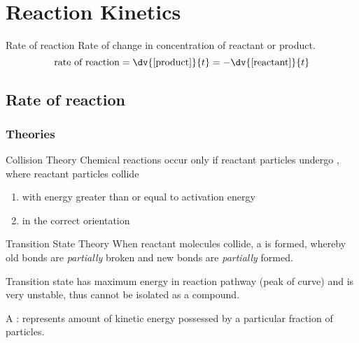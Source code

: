 \section{Reaction Kinetics}
\begin{defn}{Rate of reaction}{}
Rate of change in concentration of reactant or product.
\begin{equation}
\text{rate of reaction} = \dv{[\text{product}]}{t} = -\dv{[\text{reactant}]}{t}
\end{equation}
\end{defn}

\subsection{Rate of reaction}
\subsubsection{Theories}
\begin{defn}{Collision Theory}{}
Chemical reactions occur only if reactant particles undergo , where reactant particles collide
\begin{enumerate}
\item with energy greater than or equal to activation energy
\item in the correct orientation
\end{enumerate}
\end{defn}

\begin{defn}{Transition State Theory}{}
When reactant molecules collide, a  is formed, whereby old bonds are \emph{partially} broken and new bonds are \emph{partially} formed.

Transition state has maximum energy in reaction pathway (peak of curve) and is very unstable, thus cannot be isolated as a compound.
\end{defn}

A : represents amount of kinetic energy possessed by a particular fraction of particles.

